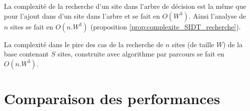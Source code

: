 La complexité de la recherche d'un site dans l'arbre de décision est la même que pour l'ajout dans d'un site dans l'arbre et se fait en $O(W^3)$.
Ainsi l'analyse de $n$ sites se fait en $O(n.W^3)$ (proposition \ref{prop:complexite_SIDT_recherche}). 

\begin{prop}
 La complexité dans le pire des cas de la recherche de $n$ sites (de taille $W$) de la base contenant $S$ sites, construite avec algorithme par parcours se fait en $O(n.W^3)$.
\label{prop:complexite_SIDT_recherche}
\end{prop}

\section{Comparaison des performances}
